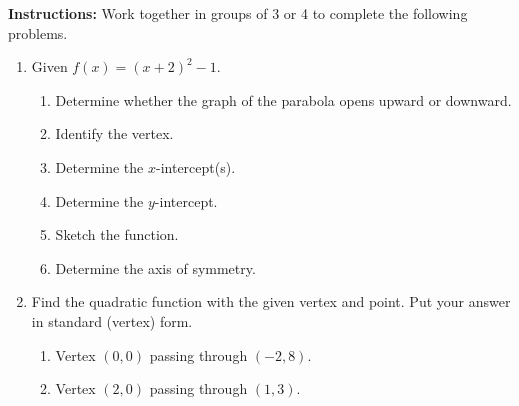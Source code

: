 



\noindent \textbf{Instructions:}  Work together in groups of  3 or 4 to complete the following problems.




\begin{enumerate}
\item Given $f(x)=(x+2)^2-1$.
\begin{enumerate}
\item Determine whether the graph of the parabola opens upward or downward.\\[.3in]
\item Identify the vertex.\\[.3in]
\item Determine the $x$-intercept(s).\\[1in]
\item Determine the $y$-intercept.\\[.5in]
\item Sketch the function.\\

\item Determine the axis of symmetry.\\


\end{enumerate}


\newpage

\item Find the quadratic function with the given vertex and point.  Put your answer in standard (vertex) form.
\begin{enumerate}
\item Vertex $(0,0)$ passing through $(-2,8)$.

\vfill


\item  Vertex $(2,0)$ passing through $(1,3)$.
\vfill
 

\end{enumerate}
\end{enumerate}
